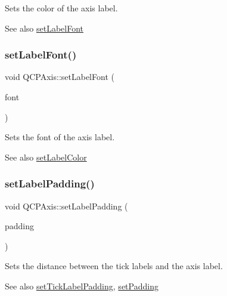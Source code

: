 Sets the color of the axis label.

\begin{DoxySeeAlso}{See also}
\hyperlink{class_q_c_p_axis_a71ac1a47f7547e490a8c4311d1433cf3}{set\+Label\+Font} 
\end{DoxySeeAlso}
\mbox{\label{class_q_c_p_axis_a71ac1a47f7547e490a8c4311d1433cf3}} 
\subsubsection{\texorpdfstring{set\+Label\+Font()}{setLabelFont()}}
{\footnotesize\ttfamily void Q\+C\+P\+Axis\+::set\+Label\+Font (\begin{DoxyParamCaption}\item[{const Q\+Font \&}]{font }\end{DoxyParamCaption})}

Sets the font of the axis label.

\begin{DoxySeeAlso}{See also}
\hyperlink{class_q_c_p_axis_a6c906fe56d75f0122335b9f79b999608}{set\+Label\+Color} 
\end{DoxySeeAlso}
\mbox{\label{class_q_c_p_axis_a4391192a766e5d20cfe5cbc17607a7a2}} 
\subsubsection{\texorpdfstring{set\+Label\+Padding()}{setLabelPadding()}}
{\footnotesize\ttfamily void Q\+C\+P\+Axis\+::set\+Label\+Padding (\begin{DoxyParamCaption}\item[{int}]{padding }\end{DoxyParamCaption})}

Sets the distance between the tick labels and the axis label.

\begin{DoxySeeAlso}{See also}
\hyperlink{class_q_c_p_axis_af302c479af9dbc2e9f0e44e07c0012ee}{set\+Tick\+Label\+Padding}, \hyperlink{class_q_c_p_axis_a5691441cb3de9e9844855d339c0db279}{set\+Padding} 
\end{DoxySeeAlso}
\mbox{\label{class_q_c_p_axis_a08af1c72db9ae4dc8cb8a973d44405ab}} 
